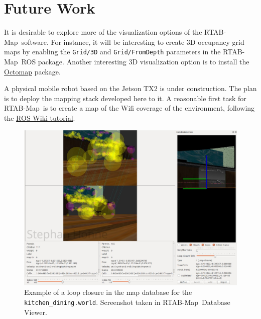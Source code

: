 \documentclass[10pt, journal, compsoc]{IEEEtran}
\newcommand{\rtab}{RTAB-Map}
\begin{document}
\section{Future Work}
\label{sec:future_work}
It is desirable to explore more of the visualization options of the \rtab\ software. For instance, it will be interesting to create 3D occupancy grid maps by enabling the \texttt{Grid/3D} and \texttt{Grid/FromDepth} parameters in the \rtab\ ROS package. Another interesting 3D visualization option is to install the \href{https://octomap.github.io/}{Octomap} package.

A physical mobile robot based on the Jetson TX2 is under construction. The plan is to deploy the mapping stack developed here to it. A reasonable first task for \rtab\ is to create a map of the Wifi coverage of the environment, following the \href{http://wiki.ros.org/rtabmap_ros/Tutorials/WifiSignalStrengthMappingUserDataUsage}{ROS Wiki tutorial}. 

\begin{figure}[thpb]
      \centering
      \includegraphics[width=\textwidth]{images/loop_closure_kitchen_dining.jpg}
      \caption{Example of a loop closure in the map database for the \texttt{kitchen\_dining.world}. Screenshot taken in \rtab\ Database Viewer.}
      \label{fig:loop_closure_kitchen_dining}
\end{figure}
\end{document}
